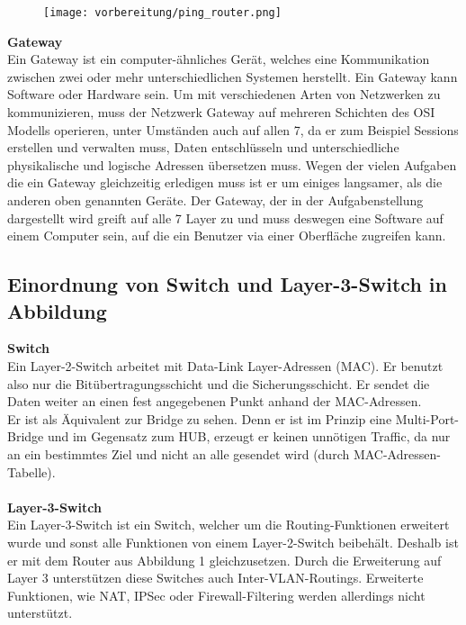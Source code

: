     \begin{figure}[H]
        \centering
        \texttt{[image: vorbereitung/ping\_router.png]}
    \end{figure}
    \vspace{0cm}
    \textbf{Gateway}
    \\
    Ein Gateway ist ein computer-ähnliches Gerät, welches eine Kommunikation zwischen zwei oder mehr unterschiedlichen Systemen herstellt. Ein Gateway kann Software oder Hardware sein. Um mit verschiedenen Arten von Netzwerken zu kommunizieren, muss der Netzwerk Gateway auf mehreren Schichten des OSI Modells operieren, unter Umständen auch auf allen 7, da er zum Beispiel Sessions erstellen und verwalten muss, Daten entschlüsseln und unterschiedliche physikalische und logische Adressen übersetzen muss. Wegen der vielen Aufgaben die ein Gateway gleichzeitig erledigen muss ist er um einiges langsamer, als die anderen oben genannten Geräte. Der Gateway, der in der Aufgabenstellung dargestellt wird greift auf alle 7 Layer zu und muss deswegen eine Software auf einem Computer sein, auf die ein Benutzer via einer Oberfläche zugreifen kann.\\

\subsection{Einordnung von Switch und Layer-3-Switch in Abbildung}

    \textbf{Switch}
    \\
    Ein Layer-2-Switch arbeitet mit Data-Link Layer-Adressen (MAC). Er benutzt also nur die Bitübertragungsschicht und die Sicherungsschicht. Er sendet die Daten weiter an einen fest angegebenen Punkt anhand der MAC-Adressen. \\
    Er ist als Äquivalent zur Bridge zu sehen. Denn er ist im Prinzip eine Multi-Port-Bridge und im Gegensatz zum HUB, erzeugt er keinen unnötigen Traffic, da nur an ein bestimmtes Ziel und nicht an alle gesendet wird (durch MAC-Adressen-Tabelle).\\
    \\
    \textbf{Layer-3-Switch}
    \\
    Ein Layer-3-Switch ist ein Switch, welcher um die Routing-Funktionen erweitert wurde und sonst alle Funktionen von einem Layer-2-Switch beibehält. Deshalb ist er mit dem Router aus Abbildung 1 gleichzusetzen. Durch die Erweiterung auf Layer 3 unterstützen diese Switches auch Inter-VLAN-Routings. Erweiterte Funktionen, wie NAT, IPSec oder Firewall-Filtering werden allerdings nicht unterstützt.



